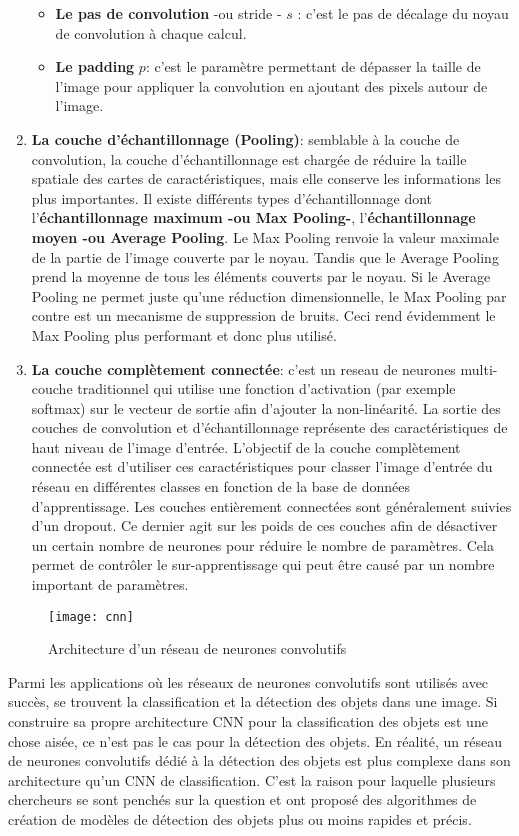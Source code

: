\begin{enumerate}
\begin{itemize}
                    \item \textbf{Le pas de convolution} -ou stride - $s$ : c’est le pas de décalage du noyau de convolution à chaque calcul.
                    \item \textbf{Le padding} $p$: c’est le paramètre permettant de dépasser la taille de l’image pour
                    appliquer la convolution en ajoutant des pixels autour de l’image.
                \end{itemize}
            \item \textbf{La couche d’échantillonnage (Pooling)}:
            semblable à la couche de convolution, la couche d’échantillonnage est chargée de réduire la taille spatiale des cartes de caractéristiques, mais elle conserve les informations les plus importantes. Il existe différents types d’échantillonnage dont l’\textbf{échantillonnage maximum -ou Max Pooling-}, l’\textbf{échantillonnage moyen -ou Average Pooling}. Le Max Pooling renvoie la valeur maximale de la partie de l’image couverte par le noyau. Tandis que le Average Pooling prend la moyenne de tous les éléments couverts par le noyau. Si le Average Pooling ne permet juste qu'une réduction dimensionnelle, le Max Pooling par contre est un mecanisme de suppression de bruits. Ceci rend évidemment le Max Pooling plus performant et donc plus utilisé.
            \item \textbf{La couche complètement connectée}: c'est un reseau de neurones multi-couche traditionnel qui utilise une fonction d’activation (par exemple softmax) sur le vecteur de sortie afin d’ajouter la non-linéarité. La sortie des couches de convolution et d’échantillonnage représente des caractéristiques de haut niveau de l’image d’entrée. L’objectif de la couche complètement connectée est d’utiliser ces caractéristiques pour classer l’image d’entrée du réseau en différentes classes en fonction de la base de données d’apprentissage. Les couches entièrement connectées sont généralement suivies d’un dropout. Ce dernier agit sur les poids de ces couches afin de désactiver un certain nombre de neurones pour réduire le nombre de paramètres. Cela permet de contrôler le sur-apprentissage qui peut être causé par un nombre important de paramètres.\cite{dahmaneThesis}
        \end{enumerate}
        \begin{figure}[H]
            \centering
            \texttt{[image: cnn]}
            \caption{Architecture d'un réseau de neurones convolutifs}
        \end{figure}
        Parmi les applications où les réseaux de neurones convolutifs sont utilisés avec succès, se trouvent la classification et la détection des objets dans une image. Si construire sa propre architecture CNN pour la classification des objets est une chose aisée, ce n’est pas le cas pour la détection des objets. En réalité, un réseau de neurones convolutifs dédié à la détection des objets est plus complexe dans son architecture qu’un CNN de classification. C’est la raison pour laquelle plusieurs chercheurs se sont penchés sur la question et ont proposé des algorithmes de création de modèles de détection des objets plus ou moins rapides et précis.
    
